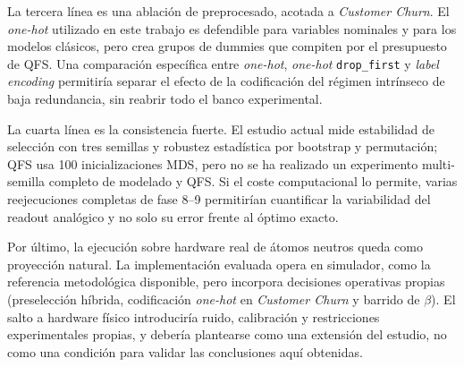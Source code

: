 La tercera línea es una ablación de preprocesado, acotada a
\textit{Customer Churn}. El \textit{one-hot} utilizado en este trabajo es
defendible para variables nominales y para los modelos clásicos, pero
crea grupos de dummies que compiten por el presupuesto de QFS\@. Una
comparación específica entre \textit{one-hot}, \textit{one-hot}
\texttt{drop\_first} y \textit{label encoding} permitiría separar el
efecto de la codificación del régimen intrínseco de baja redundancia, sin
reabrir todo el banco experimental.

La cuarta línea es la consistencia fuerte. El estudio actual mide
estabilidad de selección con tres semillas y robustez estadística por
bootstrap y permutación; QFS usa 100 inicializaciones MDS, pero no se ha
realizado un experimento multi-semilla completo de modelado y QFS\@. Si el
coste computacional lo permite, varias reejecuciones completas de fase
8--9 permitirían cuantificar la variabilidad del readout analógico y no
solo su error frente al óptimo exacto.

Por último, la ejecución sobre hardware real de átomos neutros queda
como proyección natural. La implementación evaluada opera en simulador,
como la referencia metodológica disponible, pero incorpora decisiones
operativas propias (preselección híbrida, codificación \textit{one-hot}
en \textit{Customer Churn} y barrido de $\beta$). El salto a hardware
físico introduciría ruido, calibración y
restricciones experimentales propias, y debería plantearse como una
extensión del estudio, no como una condición para validar las
conclusiones aquí obtenidas.

